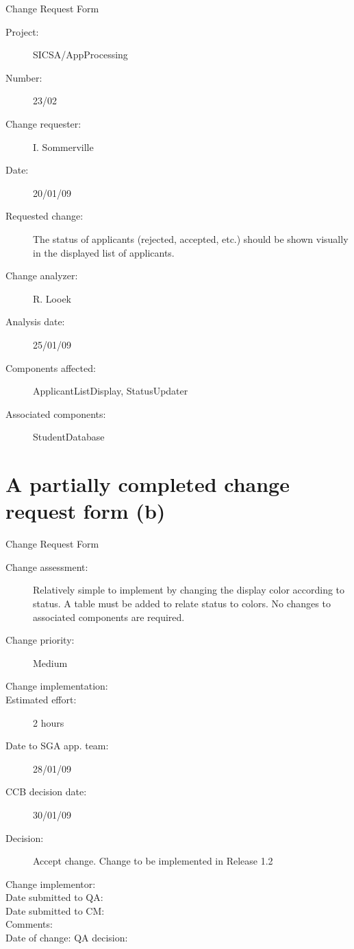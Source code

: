 Change Request Form
\begin{description}
  \item[Project:] SICSA/AppProcessing
  \item[Number:] 23/02
  \item[Change requester:] I. Sommerville
  \item[Date:] 20/01/09
  \item[Requested change:] The status of applicants (rejected, accepted, etc.) should be shown visually in the displayed list of applicants.
  \item[Change analyzer:] R. Looek
  \item[Analysis date:] 25/01/09
  \item[Components affected:] ApplicantListDisplay, StatusUpdater
  \item[Associated components:] StudentDatabase
\end{description}



\section{A partially completed change request form (b)}

Change Request Form
\begin{description}
  \item[Change assessment:]Relatively simple to implement by changing the display color according to status. A table must be added to relate status to colors. No changes to associated components are required.
  \item[Change priority:]Medium
  \item[Change implementation:]
  \item[Estimated effort:]2 hours
  \item[Date to SGA app. team:] 28/01/09
  \item[CCB decision date:] 30/01/09
  \item[Decision:] Accept change. Change to be implemented in Release 1.2

  \item[Change implementor:]
  \item[Date submitted to QA:]
  \item[Date submitted to CM:]
  \item[Comments:]
  \item[Date of change: QA decision:]

\end{description}







